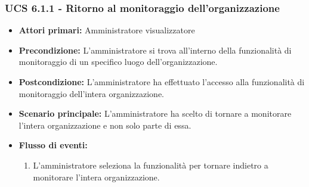 \subsubsection{UCS 6.1.1 - Ritorno al monitoraggio dell'organizzazione}
	\begin{itemize}
	\item \textbf{Attori primari:} Amministratore visualizzatore
	\item \textbf{Precondizione:} L'amministratore si trova all'interno della funzionalità di monitoraggio di un specifico luogo dell'organizzazione.
	\item \textbf{Postcondizione:} L'amministratore ha effettuato l'accesso alla funzionalità di monitoraggio dell'intera organizzazione.
	\item \textbf{Scenario principale:} L'amministratore ha scelto di tornare a monitorare l'intera organizzazione e non solo parte di essa.
	\item \textbf{Flusso di eventi:}
    \begin{enumerate}
        \item  L'amministratore seleziona la funzionalità per tornare indietro a monitorare l'intera organizzazione.
    \end{enumerate}
	\end{itemize}


